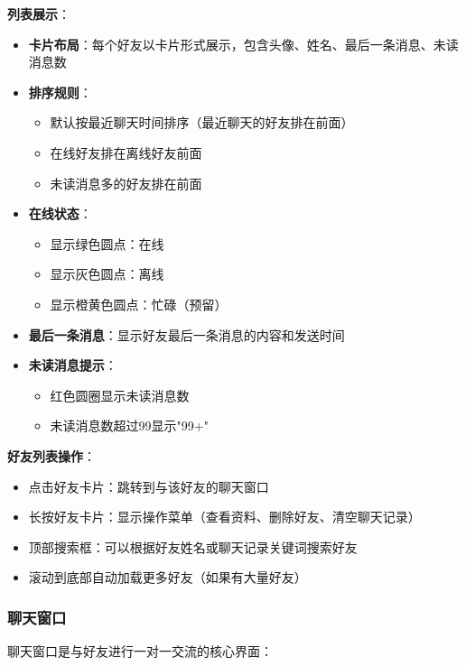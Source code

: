 \documentclass[12pt,a4paper]{article}
\begin{document}
\textbf{列表展示}：
\begin{itemize}
    \item \textbf{卡片布局}：每个好友以卡片形式展示，包含头像、姓名、最后一条消息、未读消息数
    \item \textbf{排序规则}：
        \begin{itemize}
            \item 默认按最近聊天时间排序（最近聊天的好友排在前面）
            \item 在线好友排在离线好友前面
            \item 未读消息多的好友排在前面
        \end{itemize}
    \item \textbf{在线状态}：
        \begin{itemize}
            \item 显示绿色圆点：在线
            \item 显示灰色圆点：离线
            \item 显示橙黄色圆点：忙碌（预留）
        \end{itemize}
    \item \textbf{最后一条消息}：显示好友最后一条消息的内容和发送时间
    \item \textbf{未读消息提示}：
        \begin{itemize}
            \item 红色圆圈显示未读消息数
            \item 未读消息数超过99显示"99+"
        \end{itemize}
\end{itemize}

\textbf{好友列表操作}：
\begin{itemize}
    \item 点击好友卡片：跳转到与该好友的聊天窗口
    \item 长按好友卡片：显示操作菜单（查看资料、删除好友、清空聊天记录）
    \item 顶部搜索框：可以根据好友姓名或聊天记录关键词搜索好友
    \item 滚动到底部自动加载更多好友（如果有大量好友）
\end{itemize}

\subsubsection{聊天窗口}

聊天窗口是与好友进行一对一交流的核心界面：
\end{document}
